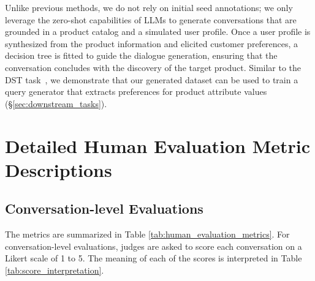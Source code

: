 
Unlike previous methods, we do not rely on initial seed annotations; we only leverage the zero-shot capabilities of LLMs to generate conversations that are grounded in a product catalog and a simulated user profile. %
Once a user profile is synthesized from the product information and elicited customer preferences, a decision tree is fitted to guide the dialogue generation, ensuring that the conversation concludes with the discovery of the target product. %
Similar to the DST task~\cite{lu2023dialgen}, we demonstrate that our generated dataset can be used to train a query generator that extracts preferences for product attribute values (\S\ref{sec:downstream_tasks}).


\section{Detailed Human Evaluation Metric Descriptions}
\subsection{Conversation-level Evaluations} 
The metrics are summarized in Table \ref{tab:human_evaluation_metrics}. For conversation-level evaluations, judges are asked to score each conversation on a Likert scale of 1 to 5. The meaning of each of the scores is interpreted in Table \ref{tab:score_interpretation}. 

